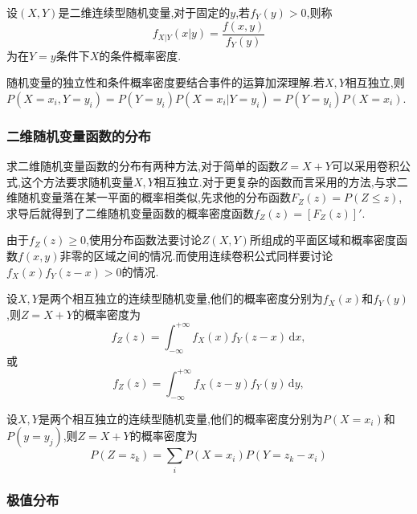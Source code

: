 \begin{definition}
    设$(X,Y)$是二维连续型随机变量,对于固定的$y$,若$f_Y(y)>0$,则称
    \begin{equation*}
        f_{X\vert Y}(x\vert y)=\frac{f(x,y)}{f_Y(y)}
    \end{equation*}
    为在$Y=y$条件下$X$的条件概率密度.
\end{definition}

随机变量的独立性和条件概率密度要结合事件的运算加深理解.若$X,Y$相互独立,则$P(X=x_i,Y=y_i)=P(Y=y_i)P(X=x_i\vert Y=y_i)=P(Y=y_i)P(X=x_i)$.

\subsubsection{二维随机变量函数的分布}
求二维随机变量函数的分布有两种方法,对于简单的函数$Z=X+Y$可以采用卷积公式,这个方法要求随机变量$X,Y$相互独立.对于更复杂的函数而言采用的方法,与求二维随机变量落在某一平面的概率相类似,先求他的分布函数$F_Z(z)=P(Z \leqslant z)$,求导后就得到了二维随机变量函数的概率密度函数$f_Z(z)=[F_Z(z)]'$.

由于$f_Z(z) \geqslant 0$,使用分布函数法要讨论$Z(X,Y)$所组成的平面区域和概率密度函数$f(x,y)$非零的区域之间的情况.而使用连续卷积公式同样要讨论$f_X(x)f_Y(z-x)>0$的情况.
\begin{ttheorem}[(连续卷积公式)]
    设$X,Y$是两个相互独立的连续型随机变量,他们的概率密度分别为$f_X(x)$和$f_Y(y)$,则$Z=X+Y$的概率密度为
    \begin{equation*}
        f_Z(z)=\int_{-\infty}^{+\infty} f_X(x)f_Y(z-x) \,\mathrm{d}x ,
    \end{equation*}
    或
    \begin{equation*}
        f_Z(z)=\int_{-\infty}^{+\infty} f_X(z-y)f_Y(y) \,\mathrm{d}y ,
    \end{equation*}
\end{ttheorem}

\begin{ttheorem}[(离散卷积公式)]
    设$X,Y$是两个相互独立的连续型随机变量,他们的概率密度分别为$P(X=x_i)$和$P(y=y_j)$,则$Z=X+Y$的概率密度为
    \begin{equation*}
        P(Z=z_k)=\sum_i P(X=x_i)P(Y=z_k-x_i)
    \end{equation*}
\end{ttheorem}

\subsubsection{极值分布}

